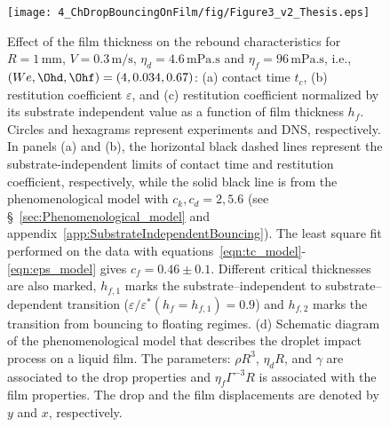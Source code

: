 \begin{figure}
	\centering
	\texttt{[image: 4\_ChDropBouncingOnFilm/fig/Figure3\_v2\_Thesis.eps]}
	\caption{Effect of the film thickness on the rebound characteristics for $R = 1\,\si{\milli\meter}$, $V = 0.3\,\si{\meter}/\si{\second}$, $\eta_{d} = 4.6\,\si{\milli\pascal}.\si{\second}$ and $\eta_{f} = 96\,\si{\milli\pascal}.\si{\second}$, i.e., $(We, \Ohd, \Ohf) = (4, 0.034, 0.67)$: (a) contact time $t_{c}$, (b) restitution coefficient $\varepsilon$, and (c) restitution coefficient normalized by its substrate independent value as a function of film thickness $h_{f}$. Circles and hexagrams represent experiments and DNS, respectively. In panels (a) and (b), the horizontal black dashed lines represent the substrate-independent limits of contact time and restitution coefficient, respectively, while the solid black line is from  the phenomenological model with $c_k, c_d = 2, 5.6$ (see \S~\ref{sec:Phenomenological_model} and appendix~\ref{app:SubstrateIndependentBouncing}). The least square fit performed on the data with equations~\eqref{eqn:tc_model}-\eqref{eqn:eps_model} gives $c_f = 0.46 \pm 0.1$. Different critical thicknesses are also marked, $h_{f,1}$ marks the substrate--independent to substrate--dependent transition ($\varepsilon/\varepsilon^*(h_f = h_{f,1}) = 0.9$) and $h_{f,2}$ marks the transition from bouncing to floating regimes.  (d) Schematic diagram of the phenomenological model that describes the droplet impact process on a liquid film. The parameters: $\rho R^{3}$, $\eta_{d}R$, and $\gamma$ are associated to the drop properties and $\eta_{f} \Gamma^{-3} R$ is associated with the film properties. The drop and the film displacements are denoted by $y$ and $x$, respectively.}
	\label{fig:figure03}
\end{figure}

